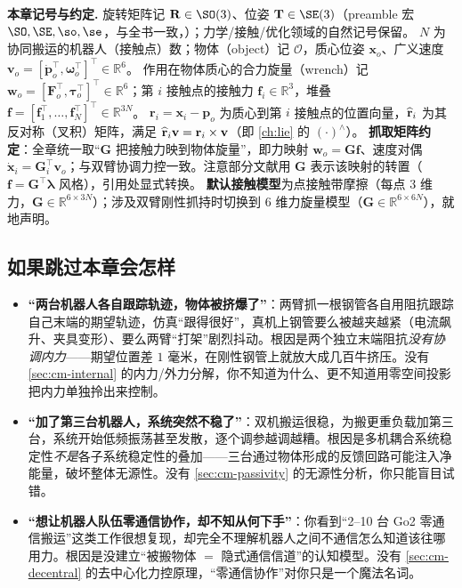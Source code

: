 \begin{note}
\textbf{本章记号与约定.}\;
旋转矩阵记 $\mathbf{R}\in\SO(3)$、位姿 $\mathbf{T}\in\SE(3)$（preamble 宏 $\SO,\SE,\so,\se$，与全书一致，）；力学/接触/优化领域的自然记号保留。
$N$ 为协同搬运的机器人（接触点）数；物体（object）记 $\mathcal{O}$，质心位姿 $\mathbf{x}_o$、广义速度 $\mathbf{v}_o=[\dot{\mathbf{p}}_o^\top,\boldsymbol{\omega}_o^\top]^\top\in\mathbb{R}^6$。
作用在物体质心的合力旋量（wrench）记 $\mathbf{w}_o=[\mathbf{F}_o^\top,\boldsymbol{\tau}_o^\top]^\top\in\mathbb{R}^6$；第 $i$ 接触点的接触力 $\mathbf{f}_i\in\mathbb{R}^3$，堆叠 $\mathbf{f}=[\mathbf{f}_1^\top,\dots,\mathbf{f}_N^\top]^\top\in\mathbb{R}^{3N}$。
$\mathbf{r}_i=\mathbf{x}_i-\mathbf{p}_o$ 为质心到第 $i$ 接触点的位置向量，$\widehat{\mathbf{r}}_i$ 为其反对称（叉积）矩阵，满足 $\widehat{\mathbf{r}}_i\mathbf{v}=\mathbf{r}_i\times\mathbf{v}$（即 \cref{ch:lie} 的 $(\cdot)^\wedge$）。
\textbf{抓取矩阵约定}：全章统一取“$\mathbf{G}$ 把接触力映到物体旋量”，即力映射 $\mathbf{w}_o=\mathbf{G}\mathbf{f}$、速度对偶 $\dot{\mathbf{x}}_i=\mathbf{G}_i^\top\mathbf{v}_o$；与双臂协调力控一致。注意部分文献用 $\mathbf{G}$ 表示该映射的转置（$\mathbf{f}=\mathbf{G}^\top\boldsymbol{\lambda}$ 风格），引用处显式转换。
\textbf{默认接触模型}为点接触带摩擦（每点 $3$ 维力，$\mathbf{G}\in\mathbb{R}^{6\times 3N}$）；涉及双臂刚性抓持时切换到 $6$ 维力旋量模型（$\mathbf{G}\in\mathbb{R}^{6\times 6N}$），就地声明。
\end{note}

\subsection*{如果跳过本章会怎样}
\begin{itemize}
  \item \textbf{“两台机器人各自跟踪轨迹，物体被挤爆了”}：两臂抓一根钢管各自用阻抗跟踪自己末端的期望轨迹，仿真“跟得很好”，真机上钢管要么被越夹越紧（电流飙升、夹具变形）、要么两臂“打架”剧烈抖动。根因是两个独立末端阻抗\emph{没有协调内力}——期望位置差 $1$ 毫米，在刚性钢管上就放大成几百牛挤压。没有 \cref{sec:cm-internal} 的内力/外力分解，你不知道为什么、更不知道用零空间投影把内力单独拎出来控制。
  \item \textbf{“加了第三台机器人，系统突然不稳了”}：双机搬运很稳，为搬更重负载加第三台，系统开始低频振荡甚至发散，逐个调参越调越糟。根因是多机耦合系统稳定性\emph{不是}各子系统稳定性的叠加——三台通过物体形成的反馈回路可能注入净能量，破坏整体无源性。没有 \cref{sec:cm-passivity} 的无源性分析，你只能盲目试错。
  \item \textbf{“想让机器人队伍零通信协作，却不知从何下手”}：你看到“2--10 台 Go2 零通信搬运”这类工作很想复现，却完全不理解机器人之间不通信怎么知道该往哪用力。根因是没建立“被搬物体 $=$ 隐式通信信道”的认知模型。没有 \cref{sec:cm-decentral} 的去中心化力控原理，“零通信协作”对你只是一个魔法名词。
\end{itemize}

